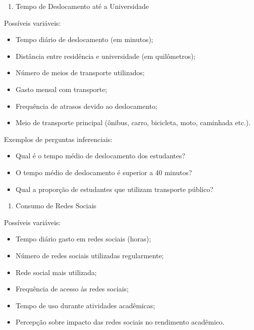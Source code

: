 \documentclass[
  letterpaper,
  DIV=11,
  numbers=noendperiod]{scrreprt}
\providecommand{\tightlist}{%
  \setlength{\itemsep}{0pt}\setlength{\parskip}{0pt}}\usepackage{longtable,booktabs,array}
\begin{document}
\begin{enumerate}
\def\labelenumi{\arabic{enumi}.}
\setcounter{enumi}{1}
\tightlist
\item
  Tempo de Deslocamento até a Universidade
\end{enumerate}

Possíveis variáveis:

\begin{itemize}
\tightlist
\item
  Tempo diário de deslocamento (em minutos);
\item
  Distância entre residência e universidade (em quilômetros);
\item
  Número de meios de transporte utilizados;
\item
  Gasto mensal com transporte;
\item
  Frequência de atrasos devido ao deslocamento;
\item
  Meio de transporte principal (ônibus, carro, bicicleta, moto,
  caminhada etc.).
\end{itemize}

Exemplos de perguntas inferenciais:

\begin{itemize}
\tightlist
\item
  Qual é o tempo médio de deslocamento dos estudantes?
\item
  O tempo médio de deslocamento é superior a 40 minutos?
\item
  Qual a proporção de estudantes que utilizam transporte público?
\end{itemize}

\begin{enumerate}
\def\labelenumi{\arabic{enumi}.}
\setcounter{enumi}{2}
\tightlist
\item
  Consumo de Redes Sociais
\end{enumerate}

Possíveis variáveis:

\begin{itemize}
\tightlist
\item
  Tempo diário gasto em redes sociais (horas);
\item
  Número de redes sociais utilizadas regularmente;
\item
  Rede social mais utilizada;
\item
  Frequência de acesso às redes sociais;
\item
  Tempo de uso durante atividades acadêmicas;
\item
  Percepção sobre impacto das redes sociais no rendimento acadêmico.
\end{itemize}
\end{document}
